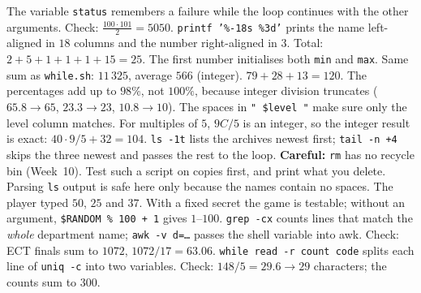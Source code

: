 \documentclass[11pt,a4paper]{article}
\newcommand{\cmd}[1]{\texttt{#1}}
\begin{document}
The variable \texttt{status} remembers a failure while the loop continues with the other arguments.
Check: $\frac{100 \cdot 101}{2} = 5050$.
\texttt{printf '\%-18s \%3d'} prints the name left-aligned in $18$ columns and the number right-aligned in $3$. Total: $2 + 5 + 1 + 1 + 1 + 15 = 25$.
The first number initialises both \texttt{min} and \texttt{max}. Same sum as \texttt{while.sh}: $11\,325$, average $566$ (integer).
$79 + 28 + 13 = 120$. The percentages add up to $98\%$, not $100\%$, because integer division truncates ($65.8 \to 65$, $23.3 \to 23$, $10.8 \to 10$). The spaces in \texttt{" \$level "} make sure only the level column matches.
For multiples of $5$, $9C/5$ is an integer, so the integer result is exact: $40 \cdot 9 / 5 + 32 = 104$.
\cmd{ls -1t} lists the archives newest first; \cmd{tail -n +4} skips the three newest and passes the rest to the loop. \textbf{Careful:} \cmd{rm} has no recycle bin (Week~10). Test such a script on copies first, and print what you delete. Parsing \cmd{ls} output is safe here only because the names contain no spaces.
The player typed $50$, $25$ and $37$. With a fixed secret the game is testable; without an argument, \texttt{\$RANDOM \% 100 + 1} gives $1$--$100$.
\cmd{grep -cx} counts lines that match the \emph{whole} department name; \texttt{awk -v d=\ldots} passes the shell variable into awk. Check: ECT finals sum to $1072$, $1072/17 = 63.06$.
\texttt{while read -r count code} splits each line of \cmd{uniq -c} into two variables. Check: $148/5 = 29.6 \to 29$ characters; the counts sum to $300$.
\end{document}
